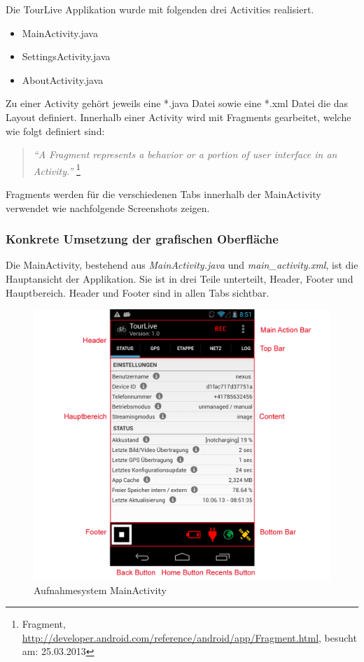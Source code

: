 Die TourLive Applikation wurde mit folgenden drei Activities realisiert.
\begin{itemize} [noitemsep,topsep=0pt]
	\item MainActivity.java
	\item SettingsActivity.java
	\item AboutActivity.java
\end{itemize}

Zu einer Activity gehört jeweils eine *.java Datei sowie eine *.xml Datei die das Layout definiert. Innerhalb einer Activity wird mit Fragments gearbeitet, welche wie folgt definiert sind:

\begin{quotation}
\textit{``A Fragment represents a behavior or a portion of user interface in an Activity.''} \footnote{Fragment, \url{http://developer.android.com/reference/android/app/Fragment.html}, besucht am: 25.03.2013}
\end{quotation}

Fragments werden für die verschiedenen Tabs innerhalb der MainActivity verwendet wie nachfolgende Screenshots zeigen.

\subsubsection{Konkrete Umsetzung der grafischen Oberfläche}
Die MainActivity, bestehend aus \textit{MainActivity.java} und \textit{main\_activity.xml}, ist die Hauptansicht der Applikation. Sie ist in drei Teile unterteilt, Header, Footer und Hauptbereich. Header und Footer sind in allen Tabs sichtbar.

\begin{figure}[H]
	\centering
	\includegraphics[width=120mm]{images/android/status.png}
	\caption{Aufnahmesystem MainActivity}
\end{figure}


